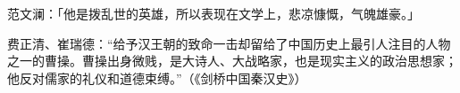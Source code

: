 范文澜：「他是拨乱世的英雄，所以表现在文学上，悲凉慷慨，气魄雄豪。」

费正清、崔瑞德：“给予汉王朝的致命一击却留给了中国历史上最引人注目的人物之一的曹操。曹操出身微贱，是大诗人、大战略家，也是现实主义的政治思想家；他反对儒家的礼仪和道德束缚。”（《剑桥中国秦汉史》）








